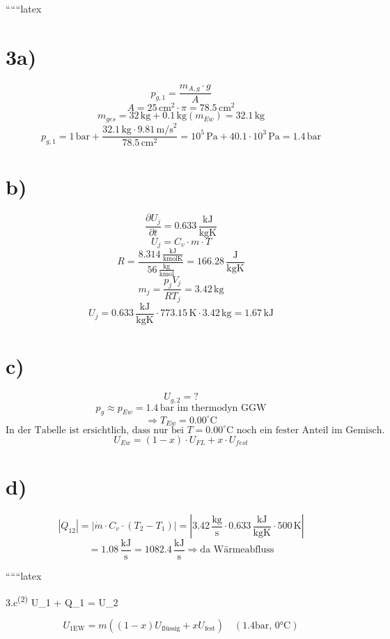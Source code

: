 
``````latex


\section*{3a)}
\[
p_{g,1} = \frac{m_{A,g} \cdot g}{A}
\]
\[
A = 25 \, \text{cm}^2 \cdot \pi = 78.5 \, \text{cm}^2
\]
\[
m_{ges} = 32 \, \text{kg} + 0.1 \, \text{kg} (m_{Ew}) = 32.1 \, \text{kg}
\]
\[
p_{g,1} = 1 \, \text{bar} + \frac{32.1 \, \text{kg} \cdot 9.81 \, \text{m/s}^2}{78.5 \, \text{cm}^2} = 10^5 \, \text{Pa} + 40.1 \cdot 10^3 \, \text{Pa} = 1.4 \, \text{bar}
\]

\section*{b)}
\[
\frac{\partial U_j}{\partial t} = 0.633 \, \frac{\text{kJ}}{\text{kgK}}
\]
\[
U_j = C_v \cdot m \cdot T
\]
\[
R = \frac{8.314 \, \frac{\text{kJ}}{\text{kmolK}}}{56 \, \frac{\text{kg}}{\text{kmol}}} = 166.28 \, \frac{\text{J}}{\text{kgK}}
\]
\[
m_j = \frac{p_j V_j}{R T_j} = 3.42 \, \text{kg}
\]
\[
U_j = 0.633 \, \frac{\text{kJ}}{\text{kgK}} \cdot 773.15 \, \text{K} \cdot 3.42 \, \text{kg} = 1.67 \, \text{kJ}
\]

\section*{c)}
\[
U_{g,2} = ?
\]
\[
p_g \approx p_{Ew} = 1.4 \, \text{bar} \text{ im thermodyn GGW}
\]
\[
\Rightarrow T_{Ew} = 0.00^\circ \text{C}
\]
\[
\text{In der Tabelle ist ersichtlich, dass nur bei } T = 0.00^\circ \text{C} \text{ noch ein fester Anteil im Gemisch.}
\]
\[
U_{Ew} = (1 - x) \cdot U_{FL} + x \cdot U_{fest}
\]

\section*{d)}
\[
\left| Q_{12} \right| = \left| \dot{m} \cdot C_v \cdot (T_2 - T_1) \right| = \left| 3.42 \, \frac{\text{kg}}{\text{s}} \cdot 0.633 \, \frac{\text{kJ}}{\text{kgK}} \cdot 500 \, \text{K} \right|
\]
\[
= 1.08 \, \frac{\text{kJ}}{\text{s}} = 1082.4 \, \frac{\text{kJ}}{\text{s}} \Rightarrow \text{da Wärmeabfluss}
\]

``````latex


3.c\textsuperscript{(2)} \quad U_{1} + Q_{1} = U_{2}

\[
U_{1\text{EW}} = m \left( (1-x) U_{\text{flüssig}} + x U_{\text{fest}} \right) \quad \left( 1.4 \text{bar, 0°C} \right)
\]


